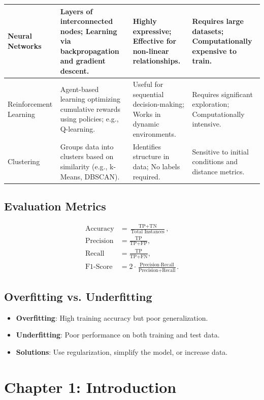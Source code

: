 \documentclass[10pt,a4paper]{article}
\begin{document}
\begin{longtable}{|p{3cm}|p{5cm}|p{5cm}|p{3cm}|}
Neural Networks & Layers of interconnected nodes; Learning via backpropagation and gradient descent. & Highly expressive; Effective for non-linear relationships. & Requires large datasets; Computationally expensive to train. \\
\hline

Reinforcement Learning & Agent-based learning optimizing cumulative rewards using policies; e.g., Q-learning. & Useful for sequential decision-making; Works in dynamic environments. & Requires significant exploration; Computationally intensive. \\
\hline

Clustering & Groups data into clusters based on similarity (e.g., k-Means, DBSCAN). & Identifies structure in data; No labels required. & Sensitive to initial conditions and distance metrics. \\
\hline

\end{longtable}

\subsection*{Evaluation Metrics}
\begin{align*}
    \text{Accuracy} &= \frac{\text{TP} + \text{TN}}{\text{Total Instances}}, \\
    \text{Precision} &= \frac{\text{TP}}{\text{TP} + \text{FP}}, \\
    \text{Recall} &= \frac{\text{TP}}{\text{TP} + \text{FN}}, \\
    \text{F1-Score} &= 2 \cdot \frac{\text{Precision} \cdot \text{Recall}}{\text{Precision} + \text{Recall}}.
\end{align*}

\subsection*{Overfitting vs. Underfitting}
\begin{itemize}
    \item \textbf{Overfitting}: High training accuracy but poor generalization.
    \item \textbf{Underfitting}: Poor performance on both training and test data.
    \item \textbf{Solutions}: Use regularization, simplify the model, or increase data.
\end{itemize}


\section*{Chapter 1: Introduction}
\end{document}
